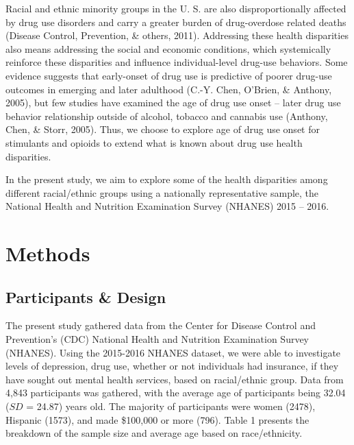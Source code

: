 \documentclass[man]{apa6}
\begin{document}
Racial and ethnic minority groups in the U. S. are also
disproportionally affected by drug use disorders and carry a greater
burden of drug-overdose related deaths (Disease Control, Prevention, \&
others, 2011). Addressing these health disparities also means addressing
the social and economic conditions, which systemically reinforce these
disparities and influence individual-level drug-use behaviors. Some
evidence suggests that early-onset of drug use is predictive of poorer
drug-use outcomes in emerging and later adulthood (C.-Y. Chen, O'Brien,
\& Anthony, 2005), but few studies have examined the age of drug use
onset -- later drug use behavior relationship outside of alcohol,
tobacco and cannabis use (Anthony, Chen, \& Storr, 2005). Thus, we
choose to explore age of drug use onset for stimulants and opioids to
extend what is known about drug use health disparities.

In the present study, we aim to explore some of the health disparities
among different racial/ethnic groups using a nationally representative
sample, the National Health and Nutrition Examination Survey (NHANES)
2015 -- 2016.

\section{Methods}\label{methods}

\subsection{Participants \& Design}\label{participants-design}

The present study gathered data from the Center for Disease Control and
Prevention's (CDC) National Health and Nutrition Examination Survey
(NHANES). Using the 2015-2016 NHANES dataset, we were able to
investigate levels of depression, drug use, whether or not individuals
had insurance, if they have sought out mental health services, based on
racial/ethnic group. Data from 4,843 participants was gathered, with the
average age of participants being 32.04 (\(SD\) = 24.87) years old. The
majority of participants were women (2478), Hispanic (1573), and made
\$100,000 or more (796). Table 1 presents the breakdown of the sample
size and average age based on race/ethnicity.
\end{document}
